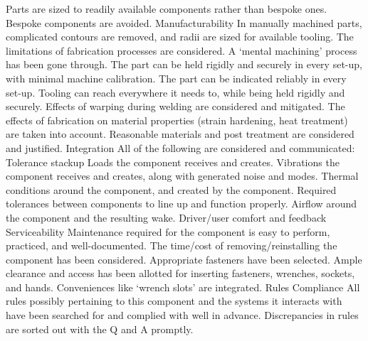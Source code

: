 \documentclass[letterpaper]{article}
\begin{document}
\begin{outline}
	\2 Parts are sized to readily available components rather than bespoke ones. Bespoke components are 	avoided.
\1 Manufacturability
	\2 In manually machined parts, complicated contours are removed, and radii are sized for available tooling.
	\2 The limitations of fabrication processes are considered.    
	\2 A ‘mental machining’ process has been gone through.
	\2 The part can be held rigidly and securely in every set-up, with minimal machine calibration.
	\2 The part can be indicated reliably in every set-up.
	\2 Tooling can reach everywhere it needs to, while being held rigidly and securely.
	\2 Effects of warping during welding are considered and mitigated.
	\2 The effects of fabrication on material properties (strain hardening, heat treatment) are taken into account.
	\2 Reasonable materials and post treatment are considered and justified.
\1 Integration
	\2 All of the following are considered and communicated:
		\3 Tolerance stackup
		\3 Loads the component receives and creates.
		\3 Vibrations the component receives and creates, along with generated noise and modes.
		\3 Thermal conditions around the component, and created by the component.
		\3 Required tolerances between components to line up and function properly.
		\3 Airflow around the component and the resulting wake.
		\3 Driver/user comfort and feedback
\1 Serviceability
	\2 Maintenance required for the component is easy to perform, practiced, and well-documented. 
	\2 The time/cost of removing/reinstalling the component has been considered. Appropriate fasteners have been selected.
	\2 Ample clearance and access has been allotted for inserting fasteners, wrenches, sockets, and hands. Conveniences like ‘wrench slots’ are integrated.
\1 Rules Compliance
	\2 All rules possibly pertaining to this component and the systems it interacts with have been searched for and complied with well in advance.
	\2 Discrepancies in rules are sorted out with the Q and A promptly.
\end{outline}
\end{document}
